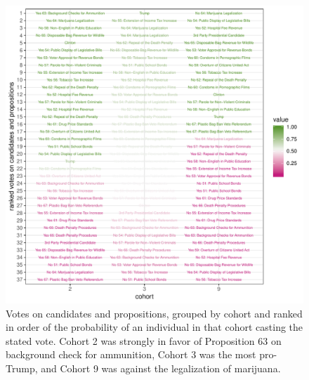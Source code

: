 \documentclass[twoside,11pt]{article}
\begin{document}
\begin{figure}[ht]
\centering
\includegraphics[width=\textwidth]{top_isses_3.pdf}
\caption{Votes on candidates and propositions, grouped by cohort and ranked in order of the probability of an individual in that cohort casting the stated vote. Cohort 2 was strongly in favor of Proposition 63 on background check for ammunition, Cohort 3 was the most pro-Trump, and Cohort 9 was against the legalization of marijuana.}
\label{fig:topissues_3cohorts}
\end{figure}
\end{document}
